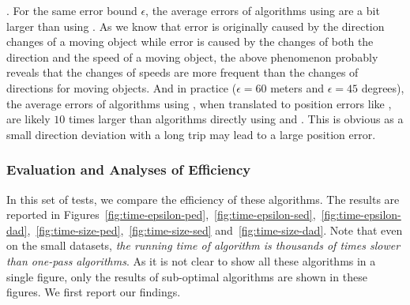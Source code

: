 .
For the same error bound $\epsilon$, the average errors of algorithms using \sed are a bit larger than using \ped. {As we know that \ped error is originally caused by the direction changes of a moving object while \sed error is caused by the changes of both the direction and the speed of a moving object, the above phenomenon probably reveals that the changes of speeds are more frequent than the changes of directions for moving objects.}
%
And in practice (\eg $\epsilon = 60$ meters and $\epsilon = 45$ degrees), the average errors of algorithms using \dad, when translated to position errors like \ped, are likely $10$ times larger than algorithms directly using \ped and \sed. This is obvious as a small direction deviation with a long trip may lead to a large position error.










\subsubsection{Evaluation and Analyses of Efficiency}

In this set of tests, we compare the efficiency of these algorithms.
The results are reported in Figures~\ref{fig:time-epsilon-ped},~\ref{fig:time-epsilon-sed},~\ref{fig:time-epsilon-dad},~\ref{fig:time-size-ped},~\ref{fig:time-size-sed} and~\ref{fig:time-size-dad}.
Note that even on the small datasets, \emph{the running time of algorithm \opt  is thousands of times slower than one-pass algorithms}. As it is not clear to show all these algorithms in a single figure, only the results of sub-optimal algorithms are shown in these figures.
We first report our findings.



